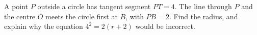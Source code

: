 A point $P$ outside a circle has tangent segment $PT=4$. The line through $P$ and the centre $O$ meets the circle first at $B$, with $PB=2$. Find the radius, and explain why the equation $4^2=2(r+2)$ would be incorrect.
